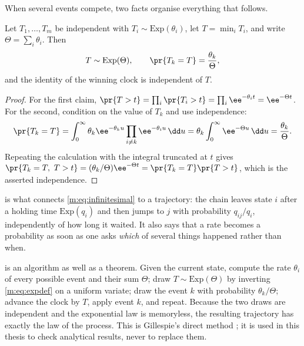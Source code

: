 When several events compete, two facts organise everything that follows.

\begin{proposition}
\label{m:prop:race}
Let $T_1,\dots,T_m$ be independent with $T_i\sim\mathrm{Exp}(\theta_i)$, let
$T=\min_iT_i$, and write $\Theta=\sum_i\theta_i$. Then
\begin{equation}
\label{m:eq:race}
T\sim\mathrm{Exp}(\Theta),
\qquad
\pr{T_k=T} = \frac{\theta_k}{\Theta},
\end{equation}
and the identity of the winning clock is independent of $T$.
\end{proposition}

\begin{proof}
For the first claim,
$\pr{T>t} = \prod_i\pr{T_i>t} = \prod_i\ee^{-\theta_it} = \ee^{-\Theta t}$.
For the second, condition on the value of $T_k$ and use independence:
\begin{equation*}
\pr{T_k=T}
= \int_0^\infty\theta_k\ee^{-\theta_ku}\prod_{i\neq k}\ee^{-\theta_iu}\,\dd u
= \theta_k\int_0^\infty\ee^{-\Theta u}\,\dd u
= \frac{\theta_k}{\Theta} .
\end{equation*}
Repeating the calculation with the integral truncated at $t$ gives
$\pr{T_k=T,\ T>t} = (\theta_k/\Theta)\ee^{-\Theta t} = \pr{T_k=T}\pr{T>t}$, which is
the asserted independence.
\end{proof}

 is what connects \cref{m:eq:infinitesimal} to a trajectory: the
chain leaves state $i$ after a holding time $\mathrm{Exp}(q_i)$ and then jumps to
$j$ with probability $q_{ij}/q_i$, independently of how long it waited. It also
says that a rate becomes a probability as soon as one asks \emph{which} of several
things happened rather than when.

\begin{remark}
\label{m:rem:gillespie}
 is an algorithm as well as a theorem. Given the current state,
compute the rate $\theta_i$ of every possible event and their sum $\Theta$; draw
$T\sim\mathrm{Exp}(\Theta)$ by inverting \cref{m:eq:expdef} on a uniform variate;
draw the event $k$ with probability $\theta_k/\Theta$; advance the clock by $T$,
apply event $k$, and repeat. Because the two draws are independent and the
exponential law is memoryless, the resulting trajectory has exactly the law of the
process. This is Gillespie's direct method \cite{Gillespie1977}; it is used in this
thesis to check analytical results, never to replace them.
\end{remark}

